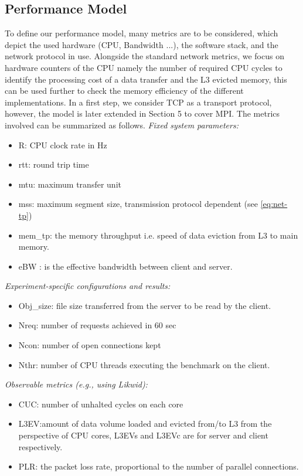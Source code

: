 \documentclass[runningheads]{llncs}
\begin{document}
\subsection{Performance Model}
To define our performance model, many metrics are to be considered, which depict the used hardware (CPU, Bandwidth ...), the software stack, and the network protocol in use. Alongside the standard network metrics, we focus on hardware counters of the CPU namely the number of required CPU cycles to identify the processing cost of a data transfer and the L3 evicted memory, this can be used further to check the memory efficiency of the different implementations. In a first step, we consider TCP as a transport protocol, however, the model is later extended in Section 5 to cover MPI. The metrics involved can be summarized as follows.
\textit{Fixed system parameters:}
\begin{itemize}
\item R: CPU clock rate in Hz
\item rtt: round trip time
\item mtu: maximum transfer unit
\item mss: maximum segment size, transmission protocol dependent (see \cref{eq:net-tp})
\item mem\_tp: the memory throughput i.e. speed of data eviction from L3 to main memory.
\item eBW \cite{chang1995effective}: is the effective bandwidth between client and server.
\end{itemize}
\textit{Experiment-specific configurations and results:}
\begin{itemize}
\item Obj\_size: file size transferred from the server to be read by the client.
\item Nreq: number of requests achieved in 60 sec
\item Ncon: number of open connections kept
\item Nthr: number of CPU threads executing the benchmark on the client.
\end{itemize}
\textit{Observable metrics (e.g., using Likwid):}
\begin{itemize}
\item CUC: number of unhalted cycles on each core %
\item L3EV:amount of data volume loaded and evicted from/to L3 from the perspective of CPU cores\cite{l3explainedlik,intel-l3}, L3EVs and L3EVc are for server and client respectively.
\item PLR: the packet loss rate, proportional to the number of parallel connections. 
\end{itemize}
\end{document}
